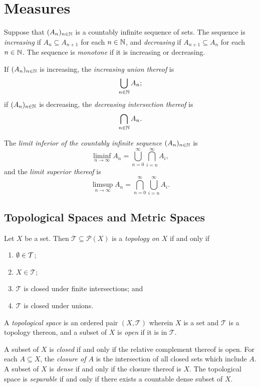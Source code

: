 



\section{Measures}

Suppose that \((A_n)_{n \in \mathbb{N}}\) is a countably infinite sequence of sets. The sequence is \emph{increasing} if
\(A_n \subseteq A_{n + 1}\) for each \(n \in \mathbb{N}\), and \emph{decreasing} if \(A_{n + 1} \subseteq A_n\) for each
\(n \in \mathbb{N}\). The sequence is \emph{monotone} if it is increasing or decreasing.

If \((A_n)_{n \in \mathbb{N}}\) is increasing, the \emph{increasing union thereof} is
\[
  \bigcup_{n \in \mathbb{N}} A_n;
\]
if \((A_n)_{n \in \mathbb{N}}\) is decreasing, the \emph{decreasing intersection thereof} is
\[
  \bigcap_{n \in \mathbb{N}} A_n.
\]

The \emph{limit inferior of the countably infinite sequence \((A_n)_{n \in \mathbb{N}}\)} is
\[
  \liminf_{n \to \infty} A_n = \bigcup_{n = 0}^\infty \bigcap_{i = n}^\infty A_i,
\]
and the \emph{limit superior thereof} is
\[
  \limsup_{n \to \infty} A_n = \bigcap_{n = 0}^\infty \bigcup_{i = n}^\infty A_i.
\]

\subsection{Topological Spaces and Metric Spaces}

\Bdf
  Let \(X\) be a set. Then \(\mathcal{T} \subseteq \mathcal{P}(X)\) is a \emph{topology on \(X\)} if and only if
  \begin{enumerate}
    \item \(\emptyset \in \mathcal{T}\);
    \item \(X \in \mathcal{T}\);
    \item \(\mathcal{T}\) is closed under finite intersections; and
    \item \(\mathcal{T}\) is closed under unions.
  \end{enumerate}

  A \emph{topological space} is an ordered pair \((X, \mathcal{T})\) wherein \(X\) is a set and \(\mathcal{T}\) is a
  topology thereon, and a subset of \(X\) is \emph{open} if it is in \(\mathcal{T}\).
\Edf

A subset of \(X\) is \emph{closed} if and only if the relative complement thereof is open. For each \(A \subseteq X\),
the \emph{closure of \(A\)} is the intersection of all closed sets which include \(A\). A subset of \(X\) is
\emph{dense} if and only if the closure thereof is \(X\). The topological space is \emph{separable} if and only if there
exists a countable dense subset of \(X\).


